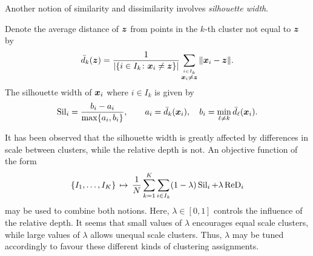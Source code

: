 Another notion of similarity and dissimilarity involves \emph{silhouette
width}.

\begin{definition}
    Denote the average distance of $\bm{z}$ from points in the $k$-th cluster not
    equal to $\bm{z}$ by
    \begin{equation}
        \bar{d}_k(\bm{z}) = \frac{1}{|\{i \in I_k\colon \bm{x}_i \neq \bm{z}\}|} \sum_{\stackrel{i \in I_k}{\bm{x}_i \neq \bm{z}}} \Vert \bm{x}_i - \bm{z} \Vert.
    \end{equation}
    The silhouette width of $\bm{x}_i$ where $i \in I_k$ is given by
    \begin{equation}
        \operatorname{Sil}_i = \frac{b_i - a_i}{\max\{a_i, b_i\}}, \qquad
        a_i = \bar{d}_k(\bm{x}_i), \quad
        b_i = \min_{\ell \neq k} \bar{d}_\ell(\bm{x}_i).
    \end{equation}
\end{definition}

It has been observed that the silhouette width is greatly affected by
differences in scale between clusters, while the relative depth is not.
An objective function of the form
\begin{equation}
    \{I_1, \dots, I_K\} \,\mapsto\, \frac{1}{N} \sum_{k = 1}^K \sum_{i \in I_k} (1 - \lambda)\operatorname{Sil}_i + \lambda\operatorname{ReD}_i
\end{equation}
may be used to combine both notions.
Here, $\lambda \in [0, 1]$ controls the influence of the relative depth.
It seems that small values of $\lambda$ encourages equal scale clusters, while
large values of $\lambda$ allows unequal scale clusters.
Thus, $\lambda$ may be tuned accordingly to favour these different kinds of
clustering assignments.
